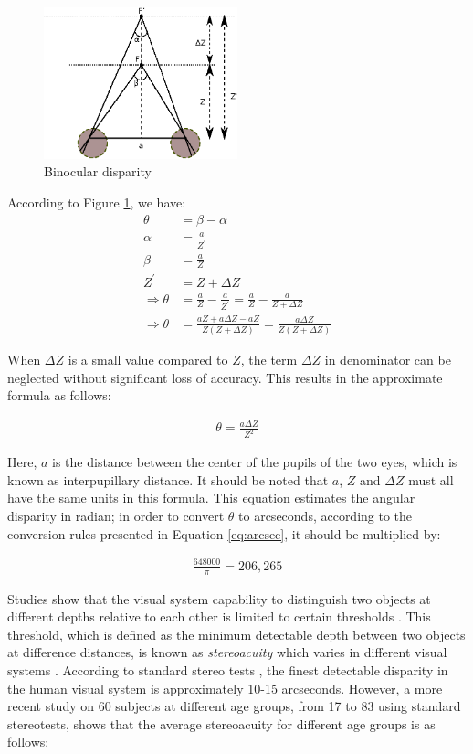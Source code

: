 \begin{figure}[!h]
\centering
\includegraphics[width=0.5\textwidth]{binocular}
\caption{Binocular disparity}
\label{fig:stereopsis}
\end{figure} 

According to Figure \ref{fig:stereopsis}, we have:
\begin{align}
\theta &= \beta - \alpha\\
\alpha &= \frac{a}{Z^{'}}\\
\beta &= \frac{a}{Z}\\
Z^{'} &= Z + \Delta Z\\
\Rightarrow \theta &= \frac{a}{Z} - \frac{a}{Z^{'}}= \frac{a}{Z} - \frac{a}{Z+\Delta Z} \\
\Rightarrow \theta &= \frac{aZ+a\Delta Z-aZ}{Z(Z+\Delta Z)} = \frac{a \Delta Z}{Z(Z+ \Delta Z)}
\end{align}

When $\Delta Z$ is a small value compared to $Z$, the term $\Delta Z$ in denominator can be neglected without 
significant loss of accuracy. This results in
the approximate formula as follows:

\begin{align}
\label{eq:stac}
\theta = \frac{a \Delta Z}{Z^{2}}
\end{align}

Here, $a$ is the distance between the center of the pupils of the two eyes, which is known as interpupillary distance.
It should be noted that $a$, $Z$ and $ \Delta Z$ must all have the same units in this formula. 
This equation estimates the angular disparity in radian; in order to convert $\theta$ to arcseconds, 
according to the conversion rules presented in Equation \ref{eq:arcsec}, it should be multiplied by:

\begin{align}
\frac {648000} {\pi} = 206,265
\end{align}

Studies show that the visual system capability to distinguish two objects at different depths relative to each other is limited to certain thresholds \cite{binr83,how95}.
This threshold, which is defined as the minimum detectable depth between two 
objects at difference distances, is known as {\it stereoacuity} which varies in different visual systems \cite{binr83,how95}. According to standard
stereo tests \cite{binr83}, the finest detectable disparity in the human visual system is approximately 10-15 arcseconds.
However, a more recent study on 60 subjects \cite{garn06} at different age groups, from 17 to 83 using standard stereotests, 
shows that the average stereoacuity for different age groups is as follows:

